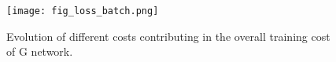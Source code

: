 \documentclass{journal}
\begin{document}
\begin{figure}[t]
	\centering
	\hspace{0cm}\texttt{[image: fig\_loss\_batch.png]}
	\caption{Evolution of different costs contributing in the overall training cost of G network.  }
	\label{fig:fig_loss}
\end{figure}













\end{document}
